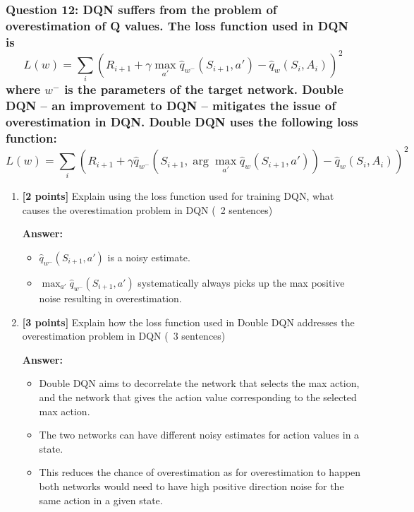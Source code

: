\documentclass[12pt]{article}
\begin{document}
\subsubsection*{Question 12: DQN suffers from the problem of overestimation of Q values. The loss function used in DQN is 
\[
L(w) = \sum_i \left( R_{i+1} + \gamma \max_{a'} \hat{q}_{w^-}(S_{i+1}, a') - \hat{q}_w(S_i, A_i) \right)^2
\]
where \( w^- \) is the parameters of the target network. Double DQN – an improvement to DQN – mitigates the issue of overestimation in DQN. Double DQN uses the following loss function:
\[
L(w) = \sum_i \left( R_{i+1} + \gamma \hat{q}_{w^-} \left(S_{i+1}, \arg\max_{a'} \hat{q}_w(S_{i+1}, a') \right) - \hat{q}_w(S_i, A_i) \right)^2
\]}

\begin{enumerate}[label=\alph*.]
    \item \textbf{[2 points]} Explain using the loss function used for training DQN, what causes the overestimation problem in DQN (~2 sentences)

    \textbf{Answer:} 
   \begin{itemize}
    \item $\hat{q}_{w^-}(S_{i+1}, a')$ is a noisy estimate. \\
    \item $\max_{a'} \hat{q}_{w^-}(S_{i+1}, a')$ systematically always picks up the max positive noise resulting in overestimation.
    \end{itemize}

    \item \textbf{[3 points]} Explain how the loss function used in Double DQN addresses the overestimation problem in DQN (~3 sentences)

   \textbf{Answer:} 
   \begin{itemize}
       \item Double DQN aims to decorrelate the network that selects the max action, and the network that gives the action value corresponding to the selected max action.
       \item The two networks can have different noisy estimates for action values in a state. 
       \item This reduces the chance of overestimation as for overestimation to happen both networks would need to have high positive direction noise for the same action in a given state.
   \end{itemize}
    
\end{enumerate}
\end{document}
